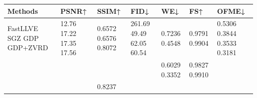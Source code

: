 \begin{tabular}{lllllll}
\toprule
Methods & PSNR↑ & SSIM↑ & FID↓ & WE↓ & FS↑ & OFME↓ \\
\midrule
FastLLVE SGZ GDP GDP+ZVRD & 12.76 17.22 17.35 17.56 & 0.6572 0.6576 0.8072 & 261.69 49.49 62.05 60.54 & 0.7236 0.4548 & 0.9791 0.9904 & 0.5306 0.3844 0.3533 0.3181 \\
 &  &  &  & 0.6029 0.3352 & 0.9827 0.9910 &  \\
 &  & 0.8237 &  &  &  &  \\
\bottomrule
\end{tabular}

